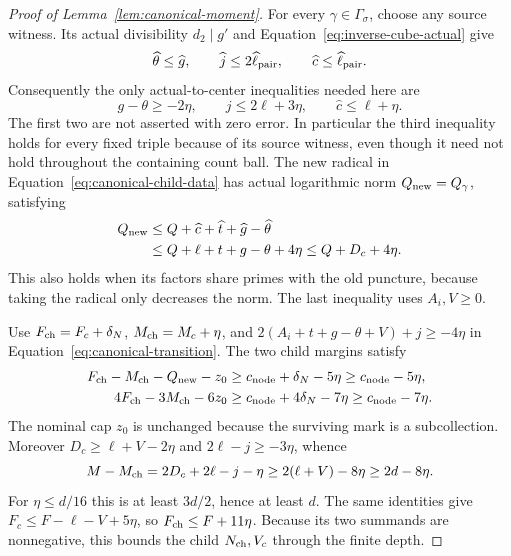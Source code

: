 \documentclass[11pt,a4paper]{article}
\numberwithin{equation}{section}
\numberwithin{figure}{section}
\theoremstyle{definition}
\theoremstyle{remark}
\begin{document}
\begin{proof}[Proof of Lemma~\ref{lem:canonical-moment}]
For every \(\gamma\in\Gamma_\sigma\), choose any source witness.
Its actual divisibility \(d_2\mid g'\) and
Equation~\eqref{eq:inverse-cube-actual} give
\[
 \widehat\theta\le\widehat g,\qquad
 \widehat j\le2\widehat\ell_{\rm pair},\qquad
 \widehat c\le\widehat\ell_{\rm pair}.
\]
Consequently the only actual-to-center inequalities needed here are
\begin{equation}\label{eq:inverse-center-inequalities}
 g-\theta\ge-2\eta,\qquad j\le2\ell+3\eta,\qquad
 \widehat c\le\ell+\eta.
\end{equation}
The first two are not asserted with zero error.  In particular the
third inequality holds for every fixed triple because of its source
witness, even though it need not hold throughout the containing count
ball.  The new radical in Equation~\eqref{eq:canonical-child-data}
has actual logarithmic norm \(Q_{\rm new}=Q_\gamma\), satisfying
\begin{equation}\label{eq:inverse-new-puncture}
 \begin{split}
 Q_{\rm new}&\le Q+\widehat c+\widehat t+\widehat g-\widehat\theta\\
 &\le Q+\ell+t+g-\theta+4\eta\le Q+D_c+4\eta.
 \end{split}
\end{equation}
This also holds when its factors share primes with the old puncture,
because taking the radical only decreases the norm.  The last inequality
uses \(A_i,V\ge0\).

Use \(F_{\rm ch}=F_c+\delta_N\), \(M_{\rm ch}=M_c+\eta\), and
\(2(A_i+t+g-\theta+V)+j\ge-4\eta\) in
Equation~\eqref{eq:canonical-transition}.  The two child margins satisfy
\begin{equation}\label{eq:inverse-child-margins}
 \begin{aligned}
 F_{\rm ch}-M_{\rm ch}-Q_{\rm new}-z_0
   &\ge c_{\rm node}+\delta_N-5\eta\ge c_{\rm node}-5\eta,\\
 4F_{\rm ch}-3M_{\rm ch}-6z_0
   &\ge c_{\rm node}+4\delta_N-7\eta\ge c_{\rm node}-7\eta.
 \end{aligned}
\end{equation}
The nominal cap \(z_0\) is unchanged because the surviving mark is a
subcollection.  Moreover \(D_c\ge\ell+V-2\eta\) and
\(2\ell-j\ge-3\eta\), whence
\begin{equation}\label{eq:inverse-row-decrease}
 M-M_{\rm ch}=2D_c+2\ell-j-\eta
       \ge2(\ell+V)-8\eta\ge2d-8\eta.
\end{equation}
For \(\eta\le d/16\) this is at least \(3d/2\), hence at least \(d\).
The same identities give \(F_c\le F-\ell-V+5\eta\), so
\(F_{\rm ch}\le F+11\eta\).  Because its two summands are nonnegative,
this bounds the child \(N_{\rm ch},V_c\) through the finite depth.


\end{proof}
\end{document}
